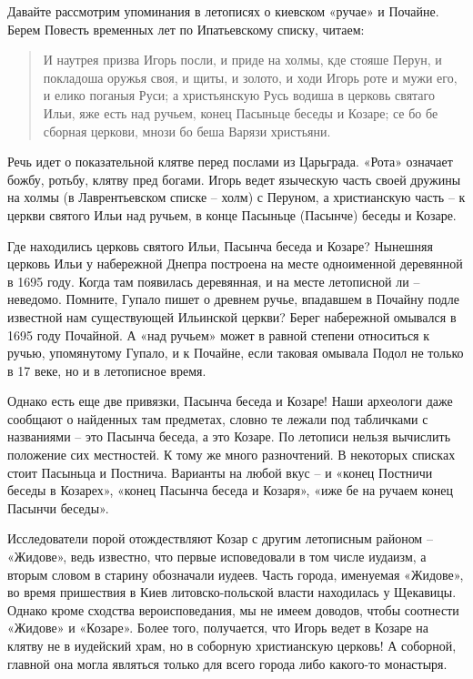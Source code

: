 Давайте рассмотрим упоминания в летописях о киевском «ручае» и Почайне. Берем Повесть временных лет по Ипатьевскому списку, читаем:

\begin{quotation}
И наутрея призва Игорь посли, и приде на холмы, кде стояше Перун, и покладоша оружья своя, и щиты, и золото, и ходи Игорь роте и мужи его, и елико поганыя Руси; а христьянскую Русь водиша в церковь святаго Ильи, яже есть над ручьем, конец Пасыньце беседы и Козаре; се бо бе сборная церкови, мнози бо беша Варязи христьяни.
\end{quotation}

Речь идет о показательной клятве перед послами из Царьграда. «Рота» означает божбу, ротьбу, клятву пред богами. Игорь ведет языческую часть своей дружины на холмы (в Лаврентьевском списке – холм) с Перуном, а христианскую часть – к церкви святого Ильи над ручьем, в конце Пасыньце (Пасынче) беседы и Козаре.

Где находились церковь святого Ильи, Пасынча беседа и Козаре? Нынешняя церковь Ильи у набережной Днепра построена на месте одноименной деревянной в 1695 году. Когда там появилась деревянная, и на месте летописной ли – неведомо. Помните, Гупало пишет о древнем ручье, впадавшем в Почайну подле известной нам существующей Ильинской церкви? Берег набережной омывался в 1695 году Почайной. А «над ручьем» может в равной степени относиться к ручью, упомянутому Гупало, и к Почайне, если таковая омывала Подол не только в 17 веке, но и в летописное время.

Однако есть еще две привязки, Пасынча беседа и Козаре! Наши археологи даже сообщают о найденных там предметах, словно те лежали под табличками с названиями – это Пасынча беседа, а это Козаре. По летописи нельзя вычислить положение сих местностей. К тому же много разночтений. В некоторых списках стоит Пасыньца и Постнича. Варианты на любой вкус – и «конец Постничи беседы в Козарех», «конец Пасынча беседа и Козаря», «иже бе на ручаем конец Пасынчи беседы».

Исследователи порой отождествляют Козар с другим летописным районом – «Жидове», ведь известно, что первые исповедовали в том числе иудаизм, а вторым словом в старину обозначали иудеев. Часть города, именуемая «Жидове», во время пришествия в Киев литовско-польской власти находилась у Щекавицы. Однако кроме сходства вероисповедания, мы не имеем доводов, чтобы соотнести «Жидове» и «Козаре». Более того, получается, что Игорь ведет в Козаре на клятву не в иудейский храм, но в соборную христианскую церковь! А соборной, главной она могла являться только для всего города либо какого-то монастыря.

